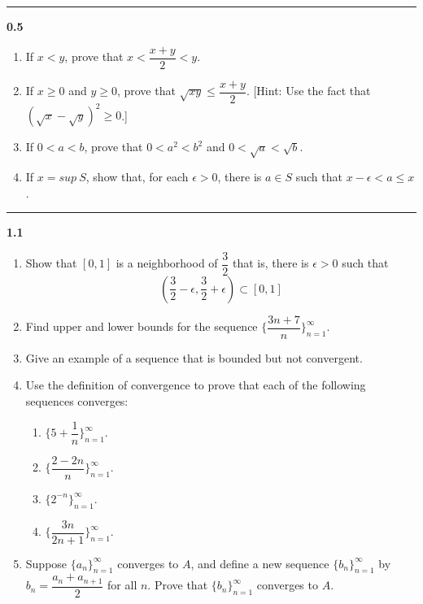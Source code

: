 \documentclass[fleqn]{article}
\begin{document}
  \rule{15cm}{2pt}

  \textbf{0.5}
  \begin{enumerate}
    \item If $x < y$, prove that $x < \dfrac{x+y}{2} < y$.

    \item If $x \geq 0$ and $y \geq 0$, prove that $\sqrt{xy} \leq \dfrac{x+y}{2}$. 
    [Hint: Use the fact that $\left(\sqrt{x}-\sqrt{y}\right)^2 \geqslant 0$.]

    \item If $0 < a < b$, prove that $0 < a^2 < b^2$ and $0 < \sqrt{a} < \sqrt{b}$.

    \item If $x=sup ~ S$, show that, for each $\epsilon > 0$, there is $a \in S$ such that
    $x-\epsilon < a \leq x$.
  \end{enumerate}

  \rule{15cm}{2pt}

  \textbf{1.1}
  \begin{enumerate}
    \item Show that $[0, 1]$ is a neighborhood of $\dfrac{3}{2}$ that is, there is $\epsilon > 0$ such that
    $$
      \left(\dfrac{3}{2}-\epsilon, \dfrac{3}{2}+\epsilon\right) \subset [0,1]
    $$

    \item Find upper and lower bounds for the sequence $\{ \dfrac{3n+7}{n}\}_{n=1}^{\infty}$.

    \item Give an example of a sequence that is bounded but not convergent.

    \item Use the definition of convergence to prove that each of the following sequences converges:
    \begin{enumerate}
      \item $\{5+\dfrac{1}{n}\}_{n=1}^{\infty}$.
      
      \item $\{\dfrac{2-2n}{n}\}_{n=1}^{\infty}$.

      \item $\{2^{-n}\}_{n=1}^{\infty}$.

      \item $\{\dfrac{3n}{2n+1}\}_{n=1}^{\infty}$.
    \end{enumerate}

    \item Suppose $\{a_n\}_{n=1}^{\infty}$ converges to $A$, and define a new sequence $\{b_n\}_{n=1}^{\infty}$ by
    $b_n=\dfrac{a_n+a_{n+1}}{2}$ for all $n$. Prove that $\{b_n\}_{n=1}^{\infty}$ converges to $A$.
  \end{enumerate}
\end{document}
